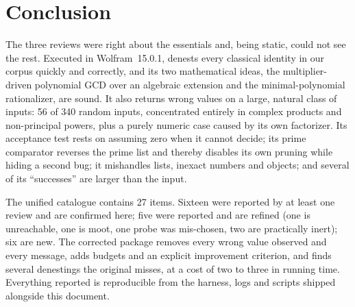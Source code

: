 \section{Conclusion}
\label{sec:conclusion}
The three reviews were right about the essentials and, being static, could
not see the rest. Executed in Wolfram~15.0.1,  denests every
classical identity in our corpus quickly and correctly, and its two
mathematical ideas, the multiplier-driven polynomial GCD over an algebraic
extension and the minimal-polynomial rationalizer, are sound. It also returns
wrong values on a large, natural class of inputs: 56 of 340 random inputs,
concentrated entirely in complex products and non-principal powers, plus a
purely numeric case caused by its own factorizer. Its acceptance test rests on
 assuming zero when it cannot decide; its prime
comparator reverses the prime list and thereby disables its own pruning
while hiding a second bug; it mishandles lists, inexact numbers and
 objects; and several of its ``successes'' are larger than the
input.

The unified catalogue contains 27 items. Sixteen were reported by at least one
review and are confirmed here; five were reported and are refined (one is
unreachable, one is moot, one probe was mis-chosen, two are practically
inert); six are new. The corrected package removes every wrong value observed
and every message, adds budgets and an explicit improvement criterion, and
finds several denestings the original misses, at a cost of two to three in
running time. Everything reported is reproducible from the harness, logs and
scripts shipped alongside this document.
